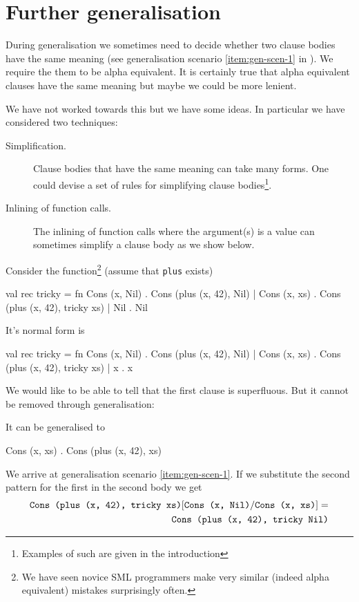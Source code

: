 \section{Further generalisation}\label{sec:furth-gener}
During generalisation we sometimes need to decide whether two clause bodies have
the same meaning (see generalisation scenario \ref{item:gen-scen-1} in
). We require the them to be alpha equivalent. It is
certainly true that alpha equivalent clauses have the same meaning but maybe we
could be more lenient.

We have not worked towards this but we have some ideas. In particular we have
considered two techniques:
\begin{description}
\item[Simplification.] Clause bodies that have the same meaning can take many
  forms. One could devise a set of rules for simplifying clause
  bodies\footnote{Examples of such are given in the introduction}.
\item[Inlining of function calls.] The inlining of function calls where the
  argument(s) is a value can sometimes simplify a clause body as we show below.
\end{description}

Consider the function\footnote{We have seen novice SML programmers make very
  similar (indeed alpha equivalent) mistakes surprisingly often.} (assume that
\texttt{plus} exists)
\begin{sml}
val rec tricky =
fn Cons (x, Nil) . Cons (plus (x, 42), Nil)
 | Cons (x, xs)  . Cons (plus (x, 42), tricky xs)
 | Nil           . Nil
\end{sml}

It's normal form is

\begin{sml}
val rec tricky =
fn Cons (x, Nil) . Cons (plus (x, 42), Nil)
 | Cons (x, xs)  . Cons (plus (x, 42), tricky xs)
 | x             . x
\end{sml}

We would like to be able to tell that the first clause is superfluous. But it
cannot be removed through generalisation:

It can be generalised to

\begin{sml}
Cons (x, xs) . Cons (plus (x, 42), xs)
\end{sml}

We arrive at generalisation scenario \ref{item:gen-scen-1}. If we substitute
the second pattern for the first in the second body we get
\begin{eqnarray*}
\texttt{Cons (plus (x, 42), tricky xs)}[\texttt{Cons (x, Nil)}/\texttt{Cons (x, xs)}] =\\
\texttt{Cons (plus (x, 42), tricky Nil)}
\end{eqnarray*}

